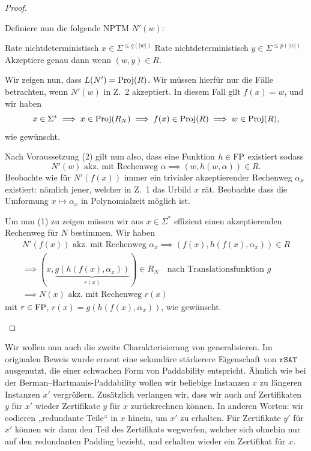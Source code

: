\begin{proof}
\begin{prooflist}[label={}]
    Definiere nun die folgende NPTM $N'(w)$:\\%
    \begin{algorithm}[H]
        Rate nichtdeterministisch $x\in \Sigma^{\leq q(|w|)}$\;
        Rate nichtdeterministisch $y\in \Sigma^{\leq p(|w|)}$\;
        Akzeptiere genau dann wenn $(w,y)\in R$.
    \end{algorithm}
    Wir zeigen nun, dass $L(N')=\operatorname{Proj}(R)$. Wir müssen hierfür nur die Fälle betrachten, wenn $N'(w)$ in Z.~2 akzeptiert.
    In diesem Fall gilt $f(x)=w$, und wir haben
    \[ x\in\Sigma^* \implies x\in\operatorname{Proj}(R_N) \implies f(x)\in\operatorname{Proj}(R) \implies w\in\operatorname{Proj}(R), \]
    wie gewünscht.

    Nach Voraussetzung (2) gilt nun also, dass eine Funktion $h\in\mathrm{FP}$ existiert sodass
    \[ N'(w) \text{ akz. mit Rechenweg $\alpha$} \implies (w,h(w,\alpha))\in R. \]
    Beobachte wie für $N'(f(x))$ immer ein trivialer akzeptierender Rechenweg $\alpha_x$ existiert: nämlich jener, welcher in Z.~1 das Urbild $x$ rät. Beobachte dass die Umformung $x\mapsto \alpha_x$ in Polynomialzeit möglich ist.

    Um nun (1) zu zeigen müssen wir aus $x\in\Sigma^*$ effizient einen akzeptierenden Rechenweg für $N$ bestimmen.
    Wir haben
    \begin{gather*}
        N'(f(x)) \text{ akz. mit Rechenweg $\alpha_x$} \implies (f(x),h(f(x),\alpha_x))\in R\\
        \implies (x, \underbrace{g(h(f(x), \alpha_x))}_{r(x)}) \in R_N \quad\text{nach Translationsfunktion $g$}\\
        \implies N(x) \text{ akz. mit Rechenweg } r(x)
    \end{gather*}
    mit $r\in \mathrm{FP}$, $r(x) = g(h(f(x), \alpha_x))$, wie gewünscht.
\end{prooflist}
\end{proof}

Wir wollen nun auch die zweite Charakterisierung von \citeauthor{messner_simulation_2001} generalisieren.
Im originalen Beweis wurde erneut eine sekundäre stärkerere Eigenschaft von $\mathtt{rSAT}$ ausgenutzt, die einer schwachen Form von Paddability entspricht. Ähnlich wie bei der Berman--Hartmanis-Paddability wollen wir beliebige Instanzen $x$ zu längeren Instanzen $x'$ vergrößern. Zusätzlich verlangen wir, dass wir auch auf Zertifikaten $y$ für $x'$ wieder Zertifikate $y$ für $x$ zurückrechnen können. In anderen Worten: wir codieren „redundante Teile“ in $x$ hinein, um $x'$ zu erhalten. Für Zertifikate $y'$ für $x'$ können wir dann den Teil des Zertifikats wegwerfen, welcher sich ohnehin nur auf den redundanten Padding bezieht, und erhalten wieder ein Zertifikat für $x$. 

